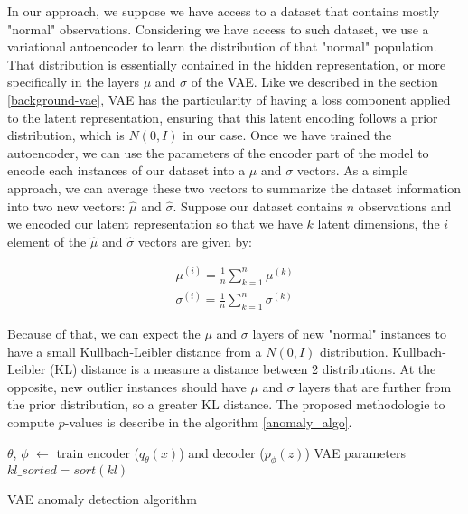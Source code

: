 \documentclass{article}
\begin{document}
In our approach, we suppose we have access to a dataset that contains mostly "normal" observations. Considering we have access to such dataset, we use a variational autoencoder to learn the distribution of that "normal" population. That distribution is essentially contained in the hidden representation, or more specifically in the layers $\mu$ and $\sigma$ of the VAE. Like we described in the section \ref{background-vae}, VAE has the particularity of having a loss component applied to the latent representation, ensuring that this latent encoding follows a prior distribution, which is $N(0, I)$ in our case. Once we have trained the autoencoder, we can use the parameters of the encoder part of the model to encode each instances of our dataset into a $\mu$ and $\sigma$ vectors. As a simple approach, we can average these two vectors to summarize the dataset information into two new vectors: $\hat{\mu}$ and $\hat{\sigma}$. Suppose our dataset contains $n$ observations and we encoded our latent representation so that we have $k$ latent dimensions, the $i$ element of the $\hat{\mu}$ and $\hat{\sigma}$ vectors are given by:

\begin{gather*}
	\mu^{(i)} = \frac{1}{n} \sum_{k=1}^{n} \mu^{(k)} \\
	\sigma^{(i)} = \frac{1}{n} \sum_{k=1}^{n} \sigma^{(k)}
\end{gather*}


Because of that, we can expect the $\mu$ and $\sigma$ layers of new "normal" instances to have a small Kullbach-Leibler distance from a $N(0, I)$ distribution. Kullbach-Leibler (KL) distance is a measure a distance between 2 distributions. At the opposite, new outlier instances should have $\mu$ and $\sigma$ layers that are further from the prior distribution, so a greater KL distance. The proposed methodologie to compute $p$-values is describe in the algorithm \ref{anomaly_algo}.
\newline

\begin{center}
	\begin{algorithm}[H] \label{anomaly_algo}
		\SetAlgoLined
	$\theta$, $\phi$ $\leftarrow$ train encoder ($q_{\theta}(x)$) and decoder ($p_{\phi}(z)$) VAE parameters\;
		$kl\_sorted = sort(kl)$\;
		\caption{VAE anomaly detection algorithm}
	\end{algorithm}
\end{center}
\end{document}

